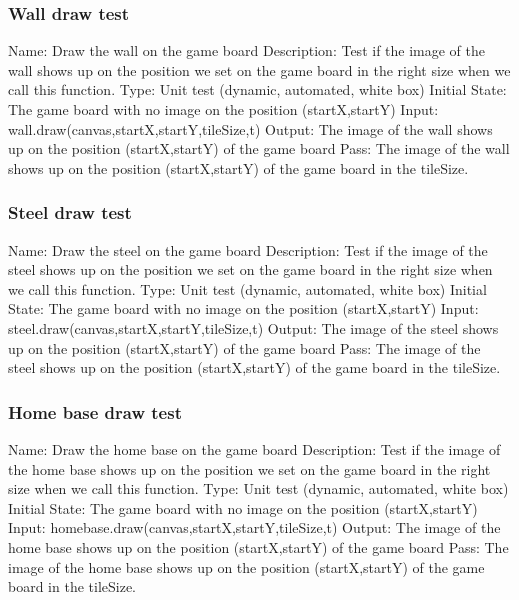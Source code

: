 \documentclass{article}
\begin{document}
\subsubsection{Wall draw test}
Name:  Draw the wall on the game board\newline
Description: Test if the image of the wall shows up on the position we set on the game board in the right size when we call this function. \newline
Type: Unit test (dynamic, automated, white box) \newline
Initial State:  The game board with no image on the position (startX,startY) \newline
Input: wall.draw(canvas,startX,startY,tileSize,t)\newline
Output: The image of the wall shows up on the position (startX,startY) of the game board\newline
Pass:  The image of the wall shows up on the position (startX,startY) of the game board in the tileSize. \newline

\subsubsection{Steel draw test}
Name:  Draw the steel on the game board\newline
Description: Test if the image of the steel shows up on the position we set on the game board in the right size when we call this function. \newline
Type: Unit test (dynamic, automated, white box) \newline
Initial State:  The game board with no image on the position (startX,startY) \newline
Input: steel.draw(canvas,startX,startY,tileSize,t)\newline
Output: The image of the steel shows up on the position (startX,startY) of the game board\newline
Pass:  The image of the steel shows up on the position (startX,startY) of the game board in the tileSize. \newline

\subsubsection{Home base draw test}
Name:  Draw the home base on the game board\newline
Description: Test if the image of the home base shows up on the position we set on the game board in the right size when we call this function. \newline
Type: Unit test (dynamic, automated, white box) \newline
Initial State:  The game board with no image on the position (startX,startY) \newline
Input: homebase.draw(canvas,startX,startY,tileSize,t)\newline
Output: The image of the home base shows up on the position (startX,startY) of the game board\newline
Pass:  The image of the home base shows up on the position (startX,startY) of the game board in the tileSize. \newline
\end{document}
